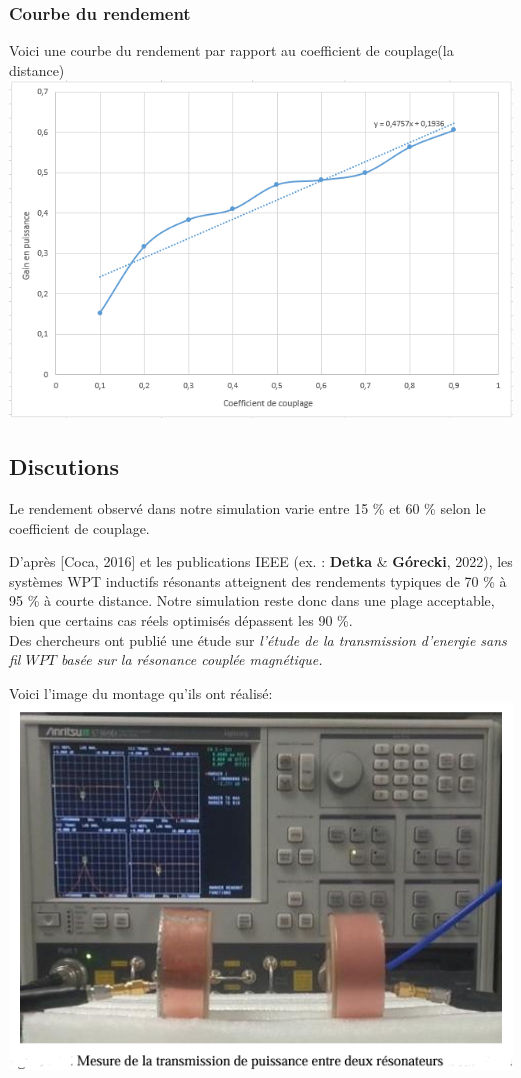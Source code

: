 \documentclass[12pt,a4paper,titlepage,notitlepage]{article}
\begin{document}
	\subsubsection*{Courbe du rendement}
	Voici une courbe du rendement par rapport au coefficient de couplage(la distance)\\
	\includegraphics[width=1\textwidth]{WPT_simul_gain_graph}\\
	
	
	\subsection{Discutions}
	
	Le rendement observé dans notre simulation varie entre 15 \% et 60 \% selon le coefficient de couplage.
	
	D’après [Coca, 2016] et les publications IEEE (ex. : \textbf{Detka} \& \textbf{Górecki}, 2022), les systèmes WPT inductifs résonants atteignent des rendements typiques de 70 \% à 95 \% à courte distance.
	Notre simulation reste donc dans une plage acceptable, bien que certains cas réels optimisés dépassent les 90 \%.\\
	
	Des chercheurs ont publié une étude sur \textit{l'étude de la transmission d'energie sans fil $WPT$ basée sur la résonance couplée magnétique.}
	
	Voici l'image du montage qu'ils ont réalisé:\\
	\includegraphics[width=1\textwidth]{WPT_disc}\\
	
\end{document}
